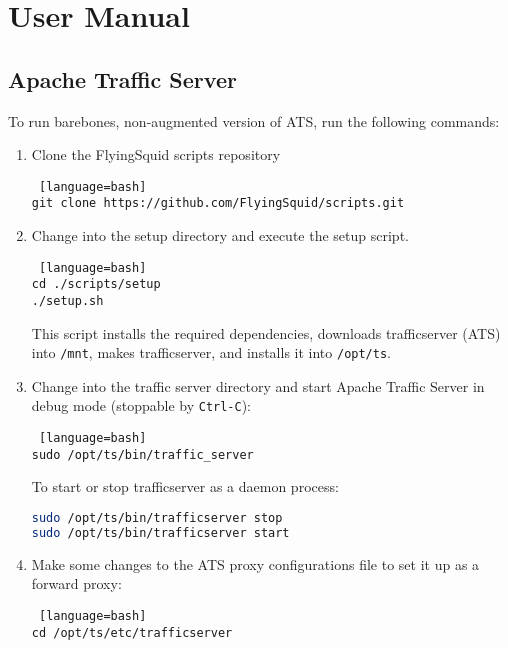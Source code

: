 \section{User Manual}

\subsection{Apache Traffic Server}

To run barebones, non-augmented version of ATS, run the following commands:

\begin{enumerate}

\item Clone the FlyingSquid scripts repository

\begin{lstlisting} [language=bash] 
git clone https://github.com/FlyingSquid/scripts.git
\end{lstlisting}

\item Change into the setup directory and execute the setup script.

\begin{lstlisting} [language=bash] 
cd ./scripts/setup
./setup.sh
\end{lstlisting}

This script installs the required dependencies, downloads trafficserver (ATS) into \verb|/mnt|, makes trafficserver, and installs it into \verb|/opt/ts|.

\item

Change into the traffic server directory and start Apache Traffic Server in debug mode (stoppable by \verb|Ctrl-C|):

\begin{lstlisting} [language=bash] 
sudo /opt/ts/bin/traffic_server
\end{lstlisting}

To start or stop trafficserver as a daemon process:
\begin{lstlisting}[language=bash]
sudo /opt/ts/bin/trafficserver stop
sudo /opt/ts/bin/trafficserver start
\end{lstlisting}

\item Make some changes to the ATS proxy configurations file to set it up as a forward proxy:

\begin{lstlisting} [language=bash] 
cd /opt/ts/etc/trafficserver
\end{lstlisting}


\end{enumerate}
